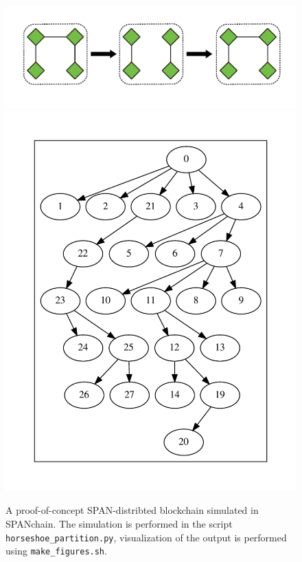 \begin{figure}[t]
	\centering
	\includegraphics[width=\columnwidth]{horseshoe.pdf}
	\includegraphics[width=\columnwidth]{horseshoe_0.pdf}
	\caption{A proof-of-concept SPAN-distribted blockchain simulated in SPANchain.
		The simulation is performed in the script \texttt{horseshoe\_partition.py},
		visualization of the output is performed using \texttt{make\_figures.sh}.}
	\label{fig:old_town_road}
\end{figure}
